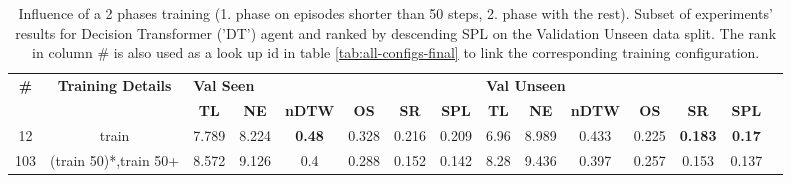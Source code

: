 \begin{table}
\centering
\caption{\label{tab:dt_split_training_50}Influence of a 2 phases training (1. phase on episodes shorter than 50 steps, 2. phase with the rest). Subset of experiments' results for Decision Transformer ('DT') agent and ranked by descending SPL on the Validation Unseen data split. The rank in column \# is also used as a look up id in table \ref{tab:all-configs-final} to link the corresponding training configuration.}
\begin{tabular}{@{\hskip3pt}c@{\hskip3pt}c@{\hskip3pt}c@{\hskip3pt}c@{\hskip3pt}c@{\hskip3pt}c@{\hskip3pt}c@{\hskip3pt}c@{\hskip3pt}c@{\hskip3pt}c@{\hskip3pt}c@{\hskip3pt}c@{\hskip3pt}c@{\hskip3pt}c@{\hskip3pt}c}
\toprule
\textbf{\#} & \textbf{Training Details} & \multicolumn{6}{l}{\textbf{Val Seen}} & \multicolumn{6}{l}{\textbf{Val Unseen}} \\
 \textbf{~} &                \textbf{~} &       \textbf{TL} & \textbf{NE} &  \textbf{nDTW} & \textbf{OS} & \textbf{SR} & \textbf{SPL} &         \textbf{TL} & \textbf{NE} & \textbf{nDTW} & \textbf{OS} &     \textbf{SR} &   \textbf{SPL} \\
\midrule
         12 &                     train &             7.789 &       8.224 &  \textbf{0.48} &       0.328 &       0.216 &        0.209 &                6.96 &       8.989 &         0.433 &       0.225 &  \textbf{0.183} &  \textbf{0.17} \\
        103 &     (train 50)*,train 50+ &             8.572 &       9.126 &            0.4 &       0.288 &       0.152 &        0.142 &                8.28 &       9.436 &         0.397 &       0.257 &           0.153 &          0.137 \\
\bottomrule
\end{tabular}
\end{table}
